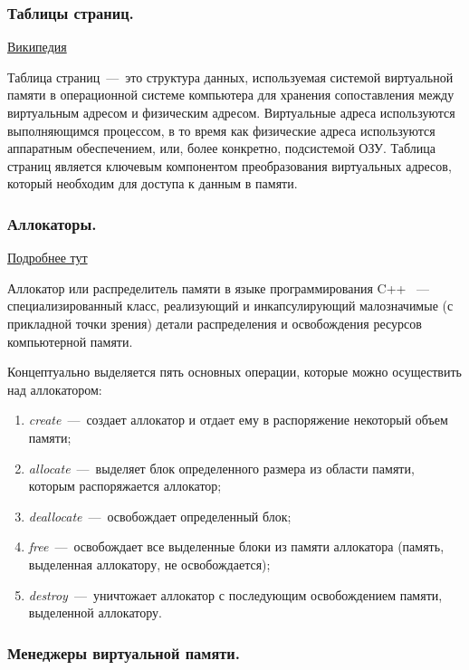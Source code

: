\subsubsection{Таблицы страниц.}

\href{https://ru.wikipedia.org/wiki/%D0%A2%D0%B0%D0%B1%D0%BB%D0%B8%D1%86%D0%B0_%D1%81%D1%82%D1%80%D0%B0%D0%BD%D0%B8%D1%86}{Википедия}

Таблица страниц~---~это структура данных, используемая системой виртуальной памяти в операционной системе компьютера для хранения сопоставления между виртуальным адресом и физическим адресом. Виртуальные адреса используются выполняющимся процессом, в то время как физические адреса используются аппаратным обеспечением, или, более конкретно, подсистемой ОЗУ. Таблица страниц является ключевым компонентом преобразования виртуальных адресов, который необходим для доступа к данным в памяти.

\subsubsection{Аллокаторы.}

\href{https://habr.com/ru/post/505632/}{Подробнее тут}

Аллокатор или распределитель памяти в языке программирования C++ ~---~ специализированный класс, реализующий и инкапсулирующий малозначимые (с прикладной точки зрения) детали распределения и освобождения ресурсов компьютерной памяти.

Концептуально выделяется пять основных операции, которые можно осуществить над аллокатором:
\begin{enumerate}
	\item \emph{create}~---~создает аллокатор и отдает ему в распоряжение некоторый объем памяти;
	\item \emph{allocate}~---~выделяет блок определенного размера из области памяти, которым распоряжается аллокатор;
	\item \emph{deallocate}~---~освобождает определенный блок;
	\item \emph{free}~---~освобождает все выделенные блоки из памяти аллокатора (память, выделенная аллокатору, не освобождается);
	\item \emph{destroy}~---~уничтожает аллокатор с последующим освобождением памяти, выделенной аллокатору.
\end{enumerate}

\subsubsection{Менеджеры виртуальной памяти.}

